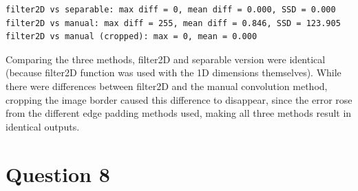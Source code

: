 \documentclass[11pt]{article}
\begin{document}
    \begin{Verbatim}[commandchars=\\\{\}]
filter2D vs separable: max diff = 0, mean diff = 0.000, SSD = 0.000
filter2D vs manual: max diff = 255, mean diff = 0.846, SSD = 123.905
filter2D vs manual (cropped): max = 0, mean = 0.000
    \end{Verbatim}

    Comparing the three methods, filter2D and separable version were
identical (because filter2D function was used with the 1D dimensions
themselves). While there were differences between filter2D and the
manual convolution method, cropping the image border caused this
difference to disappear, since the error rose from the different edge
padding methods used, making all three methods result in identical
outputs.

    \section{Question 8}\label{question-8}
\end{document}
